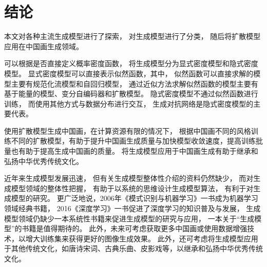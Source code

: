 \chapter*{结论}
本文对各种主流生成模型进行了探索，
对生成模型进行了分类，
随后将扩散模型应用在中国画生成领域。

可以根据是否直接定义概率密度函数，
将生成模型分为显式密度模型和隐式密度模型。
显式密度模型可以直接表示似然函数，其中，
似然函数可以直接求解的模型主要有规范化流模型和自回归模型，
通过近似方法求解似然函数的模型主要有基于能量的模型、变分自编码器和扩散模型。
隐式密度模型不通过似然函数进行训练，
而使用其他方式与数据分布进行交互，
生成对抗网络是隐式密度模型的主要代表。

使用扩散模型生成中国画，在计算资源有限的情况下，
根据中国画不同的风格训练不同的扩散模型，有助于提升中国画生成质量与加快模型收敛速度，提高训练批量也有助于提高生成中国画的质量。
将生成模型应用于中国画生成有助于继承和弘扬中华优秀传统文化。

近年来生成模型发展迅速，
但有关生成模型整体性介绍的资料仍然缺少，
而对生成模型领域的整体性把握，
有助于以系统的思维设计生成模型算法，
有利于对生成模型的研究。
更广泛地说，2006年《模式识别与机器学习》一书成为机器学习领域经典书籍，
2016《深度学习》一书促进了深度学习的知识普及与发展，
生成模型领域仍缺少一本系统性书籍来促进生成模型的研究与应用，
一本关于“生成模型”的书籍是值得期待的。
此外，未来可考虑获取更多中国画或使用数据增强技术，以增大训练集来获得更好的图像生成效果。
此外，还可考虑将生成模型应用于其他传统文化，如唐诗宋词、古典乐曲、皮影戏等，以继承和弘扬中华优秀传统文化。

